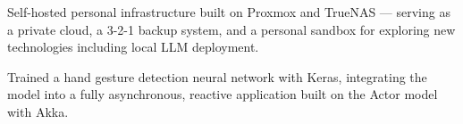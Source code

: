 \documentclass[]{plushcv}
\begin{document}
\begin{minipage}[t]{0.74\textwidth}
Self-hosted personal infrastructure built on Proxmox and TrueNAS — serving as a private cloud, a 3-2-1 backup system, and a personal sandbox for exploring new technologies including local LLM deployment.
\sectionsep
\sectionsep



\hfill
{}

Trained a hand gesture detection neural network with Keras, integrating the model into a fully asynchronous, reactive application built on the Actor model with Akka.

%
%

\end{minipage}
\hfill
\end{document}
